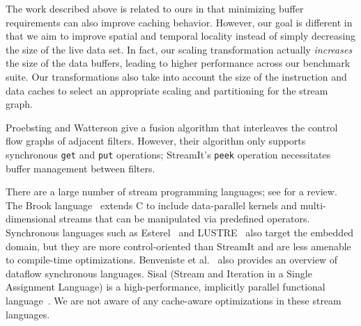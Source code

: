 The work described above is related to ours in that minimizing buffer
requirements can also improve caching behavior.  However, our goal is
different in that we aim to improve spatial and temporal locality
instead of simply decreasing the size of the live data set.  In fact,
our scaling transformation actually {\it increases} the size of the
data buffers, leading to higher performance across our benchmark
suite.  Our transformations also take into account the size of the
instruction and data caches to select an appropriate scaling and
partitioning for the stream graph.

Proebsting and Watterson \cite{pro96} give a fusion algorithm that
interleaves the control flow graphs of adjacent filters.  However,
their algorithm only supports synchronous {\tt get} and {\tt put}
operations; StreamIt's {\tt peek} operation necessitates buffer
management between filters.

There are a large number of stream programming languages; see
\cite{survey97} for a review.  The Brook language~\cite{Buck04}
extends C to include data-parallel kernels and multi-dimensional
streams that can be manipulated via predefined operators.  Synchronous
languages such as Esterel~\cite{esterel92} and LUSTRE~\cite{lustre}
also target the embedded domain, but they are more control-oriented
than StreamIt and are less amenable to compile-time optimizations.
Benveniste et al.~\cite{benveniste93dataflow} also provides an
overview of dataflow synchronous languages.  Sisal (Stream and
Iteration in a Single Assignment Language) is a high-performance,
implicitly parallel functional language~\cite{sisal}.  We are not
aware of any cache-aware optimizations in these stream languages.

